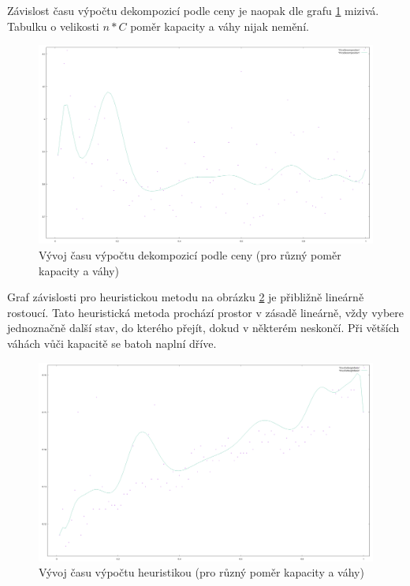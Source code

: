 \documentclass[12pt,a4paper]{article}
\begin{document}
Závislost času výpočtu dekompozicí podle ceny je naopak dle grafu \ref{ratio/PriceDecomposition} mizivá. Tabulku o velikosti $n*C$ poměr kapacity a váhy nijak nemění.

\begin{figure}[H]
\begin{center}
\includegraphics[width=\textwidth]{ratio/PriceDecomposition}
\caption{Vývoj času výpočtu dekompozicí podle ceny (pro různý poměr kapacity a váhy)}
\label{ratio/PriceDecomposition}
\end{center}
\end{figure}

Graf závislosti pro heuristickou metodu na obrázku \ref{ratio/PriceToWeightRatio} je přibližně lineárně rostoucí. Tato heuristická metoda prochází prostor v zásadě lineárně, vždy vybere jednoznačně další stav, do kterého přejít, dokud v některém neskončí. Při větších váhách vůči kapacitě se batoh naplní dříve.

\begin{figure}[H]
\begin{center}
\includegraphics[width=\textwidth]{ratio/PriceToWeightRatio}
\caption{Vývoj času výpočtu heuristikou (pro různý poměr kapacity a váhy)}
\label{ratio/PriceToWeightRatio}
\end{center}
\end{figure}
\end{document}

